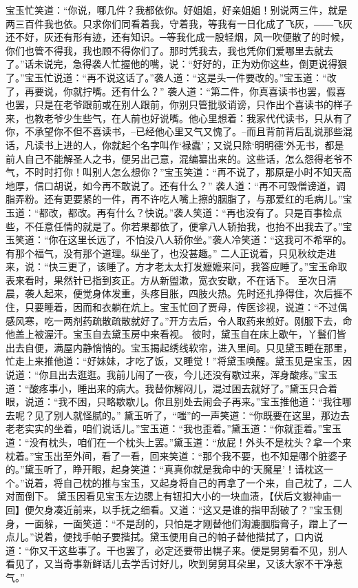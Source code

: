 \documentclass[12pt,oneside]{book}
\begin{document}
宝玉忙笑道：“你说，哪几件？我都依你。好姐姐，好亲姐姐！别说两三件，就是两三百件我也依。只求你们同看着我，守着我，等我有一日化成了飞灰，――飞灰还不好，灰还有形有迹，还有知识。─等我化成一股轻烟，风一吹便散了的时候，你们也管不得我，我也顾不得你们了。那时凭我去，我也凭你们爱哪里去就去了。”话未说完，急得袭人忙握他的嘴，说：“好好的，正为劝你这些，倒更说得狠了。”宝玉忙说道：“再不说这话了。”袭人道：“这是头一件要改的。”宝玉道：“改了，再要说，你就拧嘴。还有什么？”
袭人道：“第二件，你真喜读书也罢，假喜也罢，只是在老爷跟前或在别人跟前，你别只管批驳诮谤，只作出个喜读书的样子来，也教老爷少生些气，在人前也好说嘴。他心里想着：我家代代读书，只从有了你，不承望你不但不喜读书，--已经他心里又气又愧了。--而且背前背后乱说那些混话，凡读书上进的人，你就起个名字叫作‘禄蠹’；又说只除‘明明德’外无书，都是前人自己不能解圣人之书，便另出己意，混编纂出来的。这些话，怎么怨得老爷不气，不时时打你！叫别人怎么想你？”宝玉笑道：“再不说了，那原是小时不知天高地厚，信口胡说，如今再不敢说了。还有什么？”
袭人道：“再不可毁僧谤道，调脂弄粉。还有更要紧的一件，再不许吃人嘴上擦的胭脂了，与那爱红的毛病儿。”宝玉道：“都改，都改。再有什么？快说。”袭人笑道：“再也没有了。只是百事检点些，不任意任情的就是了。你若果都依了，便拿八人轿抬我，也抬不出我去了。”宝玉笑道：“你在这里长远了，不怕没八人轿你坐。”袭人冷笑道：“这我可不希罕的。有那个福气，没有那个道理。纵坐了，也没甚趣。”
二人正说着，只见秋纹走进来，说：“快三更了，该睡了。方才老太太打发嬷嬷来问，我答应睡了。”宝玉命取表来看时，果然针已指到亥正。方从新盥漱，宽衣安歇，不在话下。
至次日清晨，袭人起来，便觉身体发重，头疼目胀，四肢火热。先时还扎挣得住，次后捱不住，只要睡着，因而和衣躺在炕上。宝玉忙回了贾母，传医诊视，说道：“不过偶感风寒，吃一两剂药疏散疏散就好了。”开方去后，令人取药来煎好。刚服下去，命他盖上被渥汗。宝玉自去黛玉房中来看视。
彼时，黛玉自在床上歇午，丫鬟们皆出去自便，满屋内静悄悄的。宝玉揭起绣线软帘，进入里间。只见黛玉睡在那里，忙走上来推他道：“好妹妹，才吃了饭，又睡觉！”将黛玉唤醒。黛玉见是宝玉，因说道：“你且出去逛逛。我前儿闹了一夜，今儿还没有歇过来，浑身酸疼。”宝玉道：“酸疼事小，睡出来的病大。我替你解闷儿，混过困去就好了。”黛玉只合着眼，说道：“我不困，只略歇歇儿。你且别处去闹会子再来。”宝玉推他道：“我往哪去呢？见了别人就怪腻的。”
黛玉听了，“嗤”的一声笑道：“你既要在这里，那边去老老实实的坐着，咱们说话儿。”宝玉道：“我也歪着。”黛玉道：“你就歪着。”宝玉道：“没有枕头，咱们在一个枕头上罢。”黛玉道：“放屁！外头不是枕头？拿一个来枕着。”宝玉出至外间，看了一看，回来笑道：“那个我不要，也不知是哪个脏婆子的。”黛玉听了，睁开眼，起身笑道：“真真你就是我命中的‘天魔星’！请枕这一个。”说着，将自己枕的推与宝玉，又起身将自己的再拿了一个来，自己枕了，二人对面倒下。
黛玉因看见宝玉左边腮上有钮扣大小的一块血渍，【伏后文嶽神庙一回】便欠身凑近前来，以手抚之细看。又道：“这又是谁的指甲刮破了？”宝玉侧身，一面躲，一面笑道：“不是刮的，只怕是才刚替他们淘漉胭脂膏子，蹭上了一点儿。”说着，便找手帕子要揩拭。黛玉便用自己的帕子替他揩拭了，口内说道：“你又干这些事了。干也罢了，必定还要带出幌子来。便是舅舅看不见，别人看见了，又当奇事新鲜话儿去学舌讨好儿，吹到舅舅耳朵里，又该大家不干净惹气。”
\end{document}
